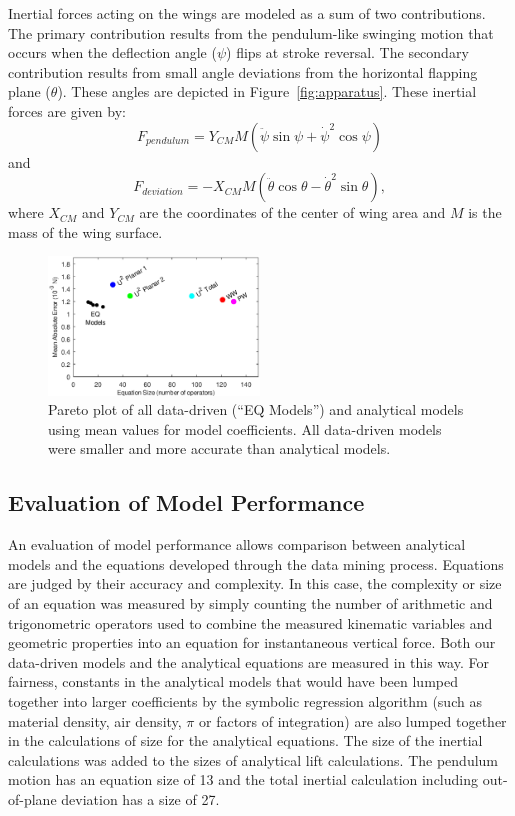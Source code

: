 \documentclass{article}
\begin{document}
Inertial forces acting on the wings are modeled as a sum of two contributions.
The primary contribution results from the pendulum-like swinging motion that
occurs when the deflection angle ($\psi$) flips at stroke reversal.  The
secondary contribution results from small angle deviations from the horizontal
flapping plane ($\theta$).  These angles are depicted in
Figure~\ref{fig:apparatus}.  These inertial forces are given by:
\begin{equation}\label{sdbla}
F_{pendulum} = Y_{CM}M(\ddot{\psi}\sin\psi + \dot{\psi}^2\cos\psi)
\end{equation}
and
\begin{equation}\label{sdbla2}
F_{deviation} = -X_{CM}M(\ddot{\theta}\cos\theta - \dot{\theta}^2\sin\theta),
\end{equation}
\noindent where \(X_{CM}\) and \(Y_{CM}\) are the coordinates of the center of wing area and \(M\) is the mass of the wing surface.

\begin{figure}
\centering
\includegraphics[width=0.5\textwidth]{figures/mae_nofit}
\caption{Pareto plot of all data-driven (``EQ Models'') and analytical models
  using mean values for model coefficients. All data-driven models were smaller
  and more accurate than analytical models.\label{fig:pareto_mae}}
\end{figure}

\subsection*{Evaluation of Model Performance}
An evaluation of model performance allows comparison between analytical models
and the equations developed through the data mining process.  Equations are
judged by their accuracy and complexity.  In this case, the complexity or size
of an equation was measured by simply counting the number of arithmetic and
trigonometric operators used to combine the measured kinematic variables and
geometric properties into an equation for instantaneous vertical force.  Both
our data-driven models and the analytical equations are measured in this way.
For fairness, constants in the analytical models that would have been lumped
together into larger coefficients by the symbolic regression algorithm (such as
material density, air density, \(\pi\) or factors of integration) are also
lumped together in the calculations of size for the analytical equations. The
size of the inertial calculations was added to the sizes of analytical lift
calculations.  The pendulum motion has an equation size of 13 and the total
inertial calculation including out-of-plane deviation has a size of 27.
\end{document}

